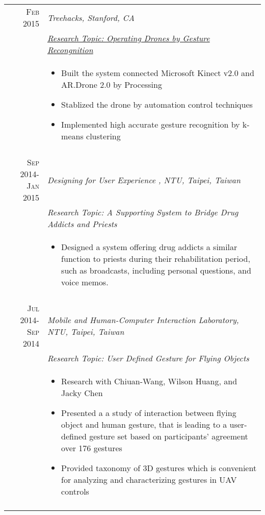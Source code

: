 \documentclass[a4paper,10pt]{article} %
\begin{document}
\begin{tabular}{r|p{11cm}}

\textsc{Feb 2015} & \emph{Treehacks, Stanford, CA}\\ 
& \href{https://www.youtube.com/watch?v=jxsZaQ6PcXU}{\emph{Research Topic: Operating Drones by Gesture Recongnition}}\\
& \footnotesize{
\begin{itemize}
\item Built the system connected Microsoft Kinect v2.0 and AR.Drone 2.0 by Processing 
\item Stablized the drone by automation control techniques
\item Implemented high accurate gesture recognition by k-means clustering
\end{itemize}} \\
\multicolumn{2}{c}{} \\

\textsc{Sep 2014-Jan 2015} & \emph{Designing for User Experience , NTU, Taipei, Taiwan}\\ 
& \emph{Research Topic: A Supporting System to Bridge Drug Addicts and Priests}\\
& \footnotesize{
\begin{itemize}
\item Designed a system offering drug addicts a similar function to priests during their rehabilitation period, such as broadcasts, including personal questions, and voice memos.
\end{itemize}} \\
\multicolumn{2}{c}{} \\

\textsc{Jul 2014-Sep 2014} & \emph{Mobile and Human-Computer Interaction Laboratory, NTU, Taipei, Taiwan}\\ 
& \emph{Research Topic: User Defined Gesture for Flying Objects}\\
& \footnotesize{
\begin{itemize}
\item Research with Chiuan-Wang, Wilson Huang, and Jacky Chen
\item Presented a a study of interaction between flying object and human gesture, that is leading to a user-defined gesture set based on participants’ agreement over 176 gestures
\item Provided taxonomy of 3D gestures which is convenient for analyzing and characterizing gestures in UAV controls
\end{itemize}} \\
\multicolumn{2}{c}{} \\

\end{tabular}
\end{document}
